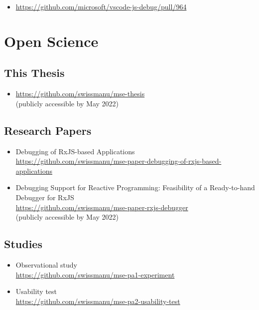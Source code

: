 \begin{itemize}
  \item \url{https://github.com/microsoft/vscode-js-debug/pull/964}
\end{itemize}





\section{Open Science}
\label{sec:open-science}

\subsection{This Thesis}
\begin{itemize}
  \item \url{https://github.com/swissmanu/mse-thesis} \\ (publicly accessible by May 2022)
\end{itemize}

\subsection{Research Papers}
\begin{itemize}
  \item Debugging of RxJS-based Applications \\ \url{https://github.com/swissmanu/mse-paper-debugging-of-rxjs-based-applications}
  \item Debugging Support for Reactive Programming: Feasibility of a Ready-to-hand Debugger for RxJS \\ \url{https://github.com/swissmanu/mse-paper-rxjs-debugger} \\ (publicly accessible by May 2022)
\end{itemize}

\subsection{Studies}
\begin{itemize}
  \item Observational study \\ \url{https://github.com/swissmanu/mse-pa1-experiment}
  \item Usability test \\ \url{https://github.com/swissmanu/mse-pa2-usability-test}
\end{itemize}
